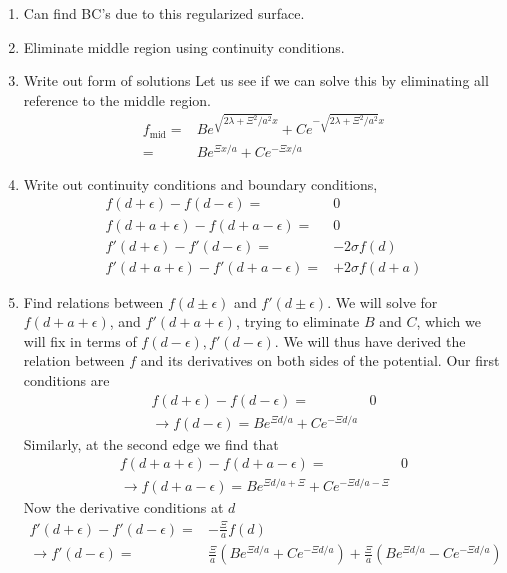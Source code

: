 \begin{enumerate}
  \item {Can find BC's due to this regularized surface.}
  \item Eliminate middle region using continuity conditions.  
  \item Write out form of solutions
    Let us see if we can solve this by eliminating all reference to the middle region.  
    \begin{align}
      f_{\text{mid}} =& Be^{\sqrt{2\lambda + \Xi^2/a^2}x} + C e^{-\sqrt{2\lambda + \Xi^2/a^2}x}\\
      =& Be^{\Xi x/a} + C e^{-\Xi x/a}
    \end{align}
  \item Write out continuity conditions
    and boundary conditions, 
    \begin{subequations}
      \begin{align}
        f(d + \epsilon)-f(d -\epsilon) =& 0\\
        f(d+a+\epsilon)- f(d+a-\epsilon)=& 0\\
        f'(d + \epsilon) -f'(d -\epsilon)=& -2\sigma f(d)\\
        f'(d+a+\epsilon) -f'(d+a-\epsilon)=& +2\sigma f(d+a)
      \end{align}
    \end{subequations}
  \item Find relations between $f(d\pm \epsilon)$ and $f'(d\pm \epsilon)$.
    We will solve for $f(d+a+\epsilon)$, and $f'(d+a+\epsilon)$, trying to eliminate $B$ and $C$, which we will fix in terms of $f(d-\epsilon),f'(d-\epsilon)$.  We will thus have derived the relation between $f$ and its derivatives on both sides of the potential.      
    Our first conditions are
    \begin{align}
      f(d+\epsilon) - f(d-\epsilon) =& 0\\
      \rightarrow f(d-\epsilon) = Be^{\Xi d/a} + C e^{-\Xi d/a}\label{eq:M c1}
    \end{align}
    Similarly, at the second edge  we find that 
    \begin{align}
      f(d+a+\epsilon) - f(d+a-\epsilon) =& 0\\
      \rightarrow f(d+a-\epsilon) = Be^{\Xi d/a+\Xi} + C e^{-\Xi d/a-\Xi}\label{eq:M c2}
    \end{align}
    Now the derivative conditions at $d$
    \begin{align}
      f'(d +\epsilon)-f'(d-\epsilon) =& -\frac{\Xi}{a}f(d)\\
      \rightarrow f'(d-\epsilon)=& \frac{\Xi}{a}\left(Be^{\Xi d/a} + C e^{-\Xi d/a}\right) + \frac{\Xi}{a}\left(Be^{\Xi d/a} - C e^{-\Xi d/a}\right)\\

\end{align}
\end{enumerate}
